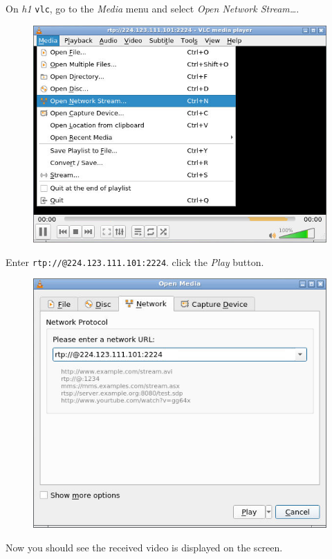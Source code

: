 \documentclass{../UTNetLab}
\begin{document}
On \textit{h1} \lstinline{vlc},
go to the \textit{Media} menu and select \textit{Open Network Stream\ldots}.
\begin{figure}[H]
    \centering
    \includegraphics[scale=1.8]{img/open-network}
\end{figure}
Enter \texttt{rtp://@224.123.111.101:2224}.
click the \textit{Play} button.
\begin{figure}[H]
    \centering
    \includegraphics[scale=1.9]{img/network}
\end{figure}

Now you should see the received video is displayed on the screen.
\end{document}
